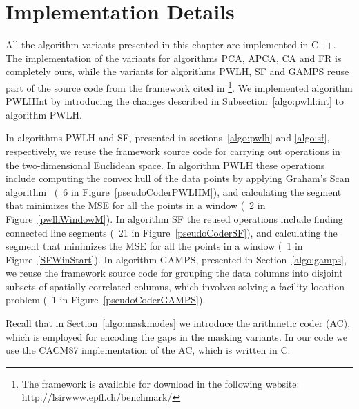 
\clearpage


\section{Implementation Details}
\label{algo:adddetails}


All the algorithm variants presented in this chapter are implemented in C++. The implementation of the variants for algorithms PCA, APCA, CA and FR is completely ours, while the variants for algorithms PWLH, SF and GAMPS reuse part of the source code from the framework cited in \cite{AnEva2013}\footnote{The framework is available for download in the following website: http://lsirwww.epfl.ch/benchmark/}. We implemented algorithm PWLHInt by introducing the changes described in Subsection~\ref{algo:pwhl:int} to algorithm PWLH. 


In algorithms PWLH and SF, presented in sections~\ref{algo:pwlh} and \ref{algo:sf}, respectively, we reuse the framework source code for carrying out operations in the two-dimensional Euclidean space. In algorithm PWLH these operations include computing the convex hull of the data points by applying Graham's Scan algorithm~\cite{GrahamAlgo} (\Line~6 in Figure~\ref{pseudoCoderPWLHM}), and calculating the segment that minimizes the MSE for all the points in a window (\Line~2 in Figure~\ref{pwlhWindowM}). In algorithm SF the reused operations include finding connected line segments (\Line~21 in Figure~\ref{pseudoCoderSF}), and calculating the segment that minimizes the MSE for all the points in a window (\Line~1 in Figure~\ref{SFWinStart}). In algorithm GAMPS, presented in Section~\ref{algo:gamps}, we reuse the framework source code for grouping the data columns into disjoint subsets of spatially correlated columns, which involves solving a facility location problem (\Line~1 in Figure~\ref{pseudoCoderGAMPS}).


Recall that in Section~\ref{algo:maskmodes} we introduce the arithmetic coder (AC), which is employed for encoding the gaps in the masking variants. In our code we use the CACM87 implementation \cite{arcodingcomp, ac1} of the AC, which is written in C.

